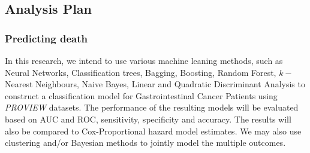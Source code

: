 \subsection{Analysis Plan}

\subsubsection{Predicting death}

%

In this research, we intend to use various machine leaning methods, such as Neural Networks, Classification trees, Bagging, Boosting, Random Forest, $k-$Nearest Neighbours, Naive Bayes, Linear and Quadratic Discriminant Analysis to construct a classification model for Gastrointestinal Cancer Patients using \textit{PROVIEW} datasets. The performance of the resulting models will be evaluated based on AUC and ROC, sensitivity, specificity and accuracy. The results will also be compared to Cox-Proportional hazard model estimates. We may also use clustering and/or Bayesian methods to jointly model the multiple outcomes.

